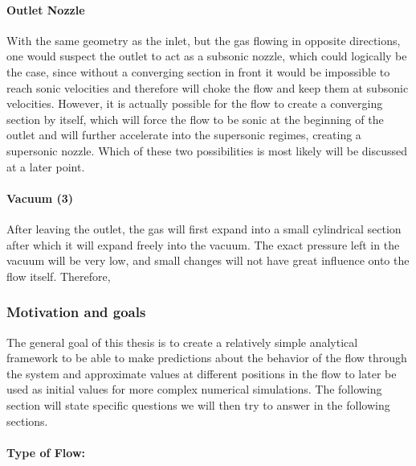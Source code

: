 \paragraph{Outlet Nozzle}
	
	With the same geometry as the inlet, but the gas flowing in opposite directions, one would suspect the outlet to act as a subsonic nozzle, which could logically be the case, since without a converging section in front it would be impossible to reach sonic velocities and therefore will choke the flow and keep them at subsonic velocities.
	However, it is actually possible for the flow to create a converging section by itself, which will force the flow to be sonic at the beginning of the outlet and will further accelerate into the supersonic regimes, creating a supersonic nozzle.
	Which of these two possibilities is most likely will be discussed at a later point.
	
\paragraph{Vacuum (3)}

	After leaving the outlet, the gas will first expand into a small cylindrical section after which it will expand freely into the vacuum.
	The exact pressure left in the vacuum will be very low, and small changes will not have great influence onto the flow itself.
	Therefore,

\newpage

\subsubsection{Motivation and goals}

	The general goal of this thesis is to create a relatively simple analytical framework to be able to make predictions about the behavior of the flow through the system and approximate values at different positions in the flow to later be used as initial values for more complex numerical simulations.
	The following section will state specific questions we will then try to answer in the following sections.
	
\paragraph{Type of Flow:}

